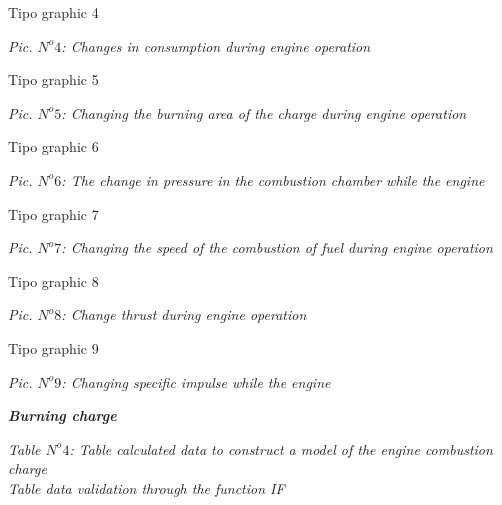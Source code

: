 Tipo graphic 4 \\
\begin{flushright}
\textit{Pic. $N^o 4$: Changes in consumption during engine operation}\\
\end{flushright}
Tipo graphic 5 \\
\begin{flushright}
\textit{Pic. $N^o 5$: Changing the burning area of the charge during engine operation}\\
\end{flushright}
Tipo graphic 6 \\
\begin{flushright}
\textit{Pic. $N^o 6$: The change in pressure in the combustion chamber while the engine}\\
\end{flushright}
Tipo graphic 7 \\
\begin{flushright}
\textit{Pic. $N^o 7$: Changing the speed of the combustion of fuel during engine operation}\\
\end{flushright}
Tipo graphic 8 \\
\begin{flushright}
\textit{Pic. $N^o 8$: Change thrust during engine operation}\\
\end{flushright}
Tipo graphic 9 \\
\begin{flushright}
\textit{Pic. $N^o 9$: Changing specific impulse while the engine}\\
\end{flushright}
\begin{center}
\begin{large}
\textbf{\textit {Burning charge}}\\
\end{large}
\end{center}
\begin{flushright}
\textit{Table $N^o 4$: Table calculated data to construct a model of the engine combustion charge\\Table data validation through the function IF}\\
\end{flushright}
